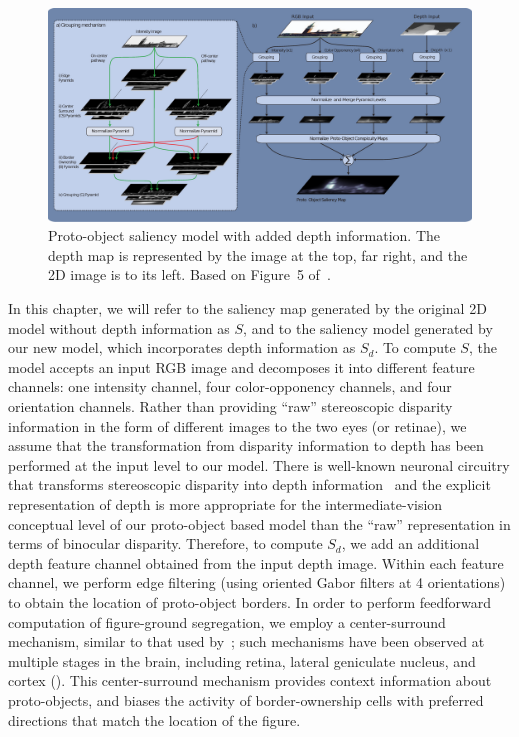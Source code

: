 \begin{figure}[t]
\centering
\includegraphics[width=\textwidth]{3D-Saliency/figs/DepthSaliency_new1.eps}
\makeatletter
\let\@currsize\normalsize
\caption{Proto-object saliency model with added depth information. The depth map is represented by the image at the top, far right, and the 2D image is to its left. Based on Figure~5 of~\cite{Russell_etal14}.}
\label{Fig:Model}
\end{figure}

In this chapter, we will refer to the saliency map generated by the original 2D model without depth information as $S$, and to the saliency model generated by our new model, which incorporates depth information as $S_d$. To compute $S$, the model accepts an input RGB image and decomposes it into different feature channels: one intensity channel, four color-opponency channels, and four orientation channels. Rather than providing ``raw'' stereoscopic disparity information in the form of different images to the two eyes (or retinae), we assume that the transformation from disparity information to depth has been performed at the input level to our model. There is well-known neuronal circuitry that transforms stereoscopic disparity into depth information~\cite[\eg][]{Poggio_Poggio84} and the explicit representation of depth is more appropriate for the intermediate-vision conceptual level of our proto-object based model than the ``raw'' representation in terms of binocular disparity. Therefore, to compute $S_d$, we add an additional depth feature channel obtained from the input depth image. Within each feature channel, we perform edge filtering (using oriented Gabor filters at 4 orientations) to obtain the location of proto-object borders. In order to perform feedforward computation of figure-ground segregation, we employ a center-surround mechanism, similar to that used by~\cite{Itti_etal98a}; such mechanisms have been observed at multiple stages in the brain, including retina, lateral geniculate nucleus, and cortex (\ibid). This center-surround mechanism provides context information about proto-objects, and biases the activity of border-ownership cells with preferred directions that match the location of the figure.

